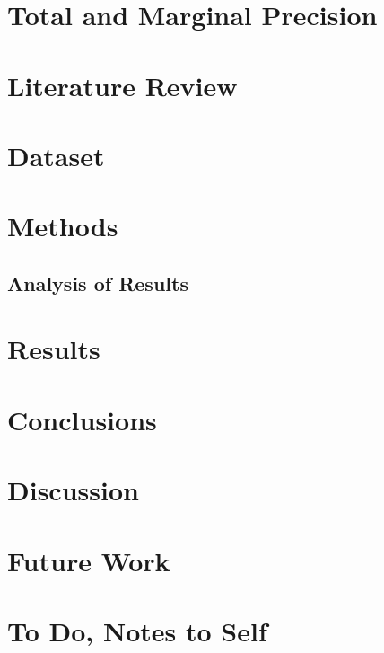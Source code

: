 \documentclass[fleqn]{cas-sc}
\begin{document}
\section{Total and Marginal Precision}



\section{Literature Review}\label{LitReview}

\section{Dataset}\label{Dataset}

\section{Methods}\label{Methods}
%

\subsection{Analysis of Results}\label{Analysis}




\section{Results}\label{Results}
%
%

\section{Conclusions}\label{Conclusions}

\section{Discussion}\label{Discussion}

\section{Future Work}\label{FutureWork}

\section{To Do, Notes to Self}
%
\end{document}
